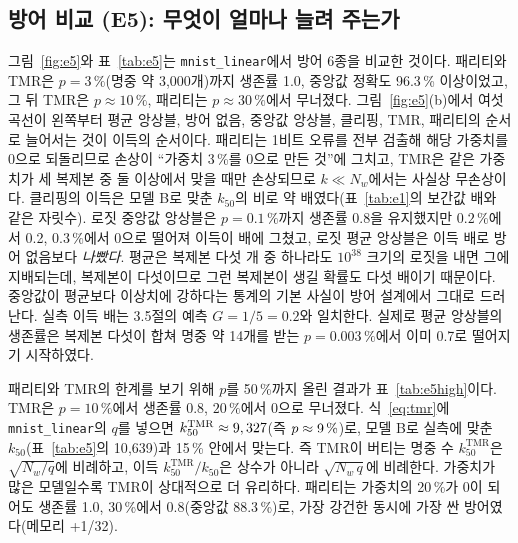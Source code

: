 \documentclass[11pt,a4paper]{article}
\newcommand{\code}[1]{\texttt{#1}}
\begin{document}
\subsection{방어 비교 (E5): 무엇이 얼마나 늘려 주는가}
\label{sec:e5}
그림~\ref{fig:e5}와 표~\ref{tab:e5}는 \code{mnist\_linear}에서 방어 6종을 비교한 것이다. 패리티와 TMR은 $p=3\,\%$(명중 약 3{,}000개)까지 생존률 1.0, 중앙값 정확도 96.3\,\% 이상이었고, 그 뒤 TMR은 $p\approx10\,\%$, 패리티는 $p\approx30\,\%$에서 무너졌다. 그림~\ref{fig:e5}(b)에서 여섯 곡선이 왼쪽부터 평균 앙상블, 방어 없음, 중앙값 앙상블, 클리핑, TMR, 패리티의 순서로 늘어서는 것이 이득의 순서이다. 패리티는 1비트 오류를 전부 검출해 해당 가중치를 0으로 되돌리므로 손상이 ``가중치 3\,\%를 0으로 만든 것''에 그치고, TMR은 같은 가중치가 세 복제본 중 둘 이상에서 맞을 때만 손상되므로 $k\ll N_w$에서는 사실상 무손상이다. 클리핑의 이득은 모델 B로 맞춘 $k_{50}$의 비로 약 \GainEClip{}배였다(표~\ref{tab:e1}의 보간값 \PhalfRatio{}배와 같은 자릿수). 로짓 중앙값 앙상블은 $p=0.1\,\%$까지 생존률 0.8을 유지했지만 $0.2\,\%$에서 0.2, $0.3\,\%$에서 0으로 떨어져 이득이 \GainEEnsMed{}배에 그쳤고, 로짓 평균 앙상블은 이득 \GainEEns{}배로 방어 없음보다 \emph{나빴다}. 평균은 복제본 다섯 개 중 하나라도 $10^{38}$ 크기의 로짓을 내면 그에 지배되는데, 복제본이 다섯이므로 그런 복제본이 생길 확률도 다섯 배이기 때문이다. 중앙값이 평균보다 이상치에 강하다는 통계의 기본 사실이 방어 설계에서 그대로 드러난다. 실측 이득 \GainEEns{}배는 3.5절의 예측 $G=1/5=0.2$와 일치한다. 실제로 평균 앙상블의 생존률은 복제본 다섯이 합쳐 명중 약 14개를 받는 $p=0.003\,\%$에서 이미 0.7로 떨어지기 시작하였다.

패리티와 TMR의 한계를 보기 위해 $p$를 50\,\%까지 올린 결과가 표~\ref{tab:e5high}이다. TMR은 $p=10\,\%$에서 생존률 0.8, $20\,\%$에서 0으로 무너졌다. 식~\eqref{eq:tmr}에 \code{mnist\_linear}의 $q$를 넣으면 $k_{50}^{\mathrm{TMR}}\approx9,327$(즉 $p\approx9\,\%$)로, 모델 B로 실측에 맞춘 $k_{50}$(표~\ref{tab:e5}의 10{,}639)과 15\,\% 안에서 맞는다. 즉 TMR이 버티는 명중 수 $k_{50}^{\mathrm{TMR}}$은 $\sqrt{N_w/q}$에 비례하고, 이득 $k_{50}^{\mathrm{TMR}}/k_{50}$은 상수가 아니라 $\sqrt{N_w\,q}$에 비례한다. 가중치가 많은 모델일수록 TMR이 상대적으로 더 유리하다. 패리티는 가중치의 20\,\%가 0이 되어도 생존률 1.0, 30\,\%에서 0.8(중앙값 88.3\,\%)로, 가장 강건한 동시에 가장 싼 방어였다(메모리 +1/32).

\begin{table}[!htb]
  \centering\scriptsize
  \caption{고선량에서의 TMR과 패리티(\code{mnist\_linear}, 각 10회). TMR 예측은 식~\eqref{eq:tmr}의 $\exp(-3k^2q/(32N_w))$.}
  \label{tab:e5high}
  
\end{table}
\end{document}
